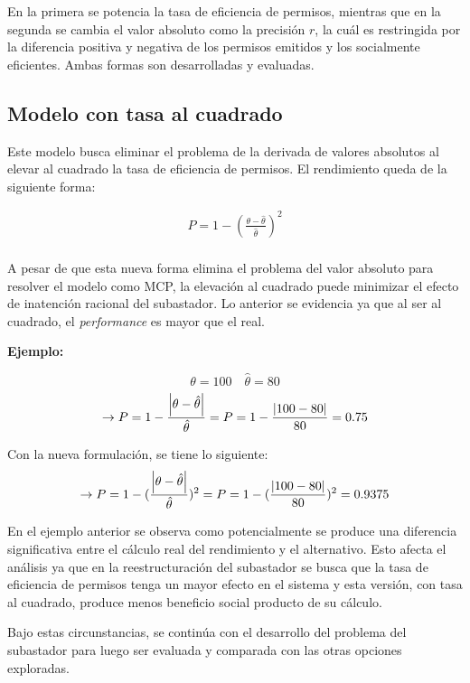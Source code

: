 En la primera se potencia la tasa de eficiencia de permisos, mientras que en la segunda se cambia el valor absoluto como la precisión $r$, la cuál es restringida por la diferencia positiva y negativa de los permisos emitidos y los socialmente eficientes. Ambas formas son desarrolladas y evaluadas.

\subsection{Modelo con tasa al cuadrado}\label{tasacuadrada}

Este modelo busca eliminar el problema de la derivada de valores absolutos al elevar al cuadrado la tasa de eficiencia de permisos. El rendimiento queda de la siguiente forma:  
\vspace{2.5mm}

\begin{equation}
\begin{array}{rrclcl}
\displaystyle P = 1- (\frac{{\theta - \hat{\theta}}}{\hat{\theta}})^2 \\
\end{array}
\end{equation}

A pesar de que esta nueva forma elimina el problema del valor absoluto para resolver el modelo como
MCP, la elevación al cuadrado puede minimizar el efecto de inatención racional del subastador. Lo anterior se evidencia ya que al ser al cuadrado, el \textit{performance} es mayor que el real. 
\vspace{2.5mm}

\textbf{Ejemplo:}

$$\theta= 100 \quad \hat{\theta}=80$$
$$\rightarrow P= 1 - \frac{\abs{\theta-\hat{\theta}}}{\hat{\theta}}=P= 1 - \frac{\abs{100-80}}{80} = 0.75$$

Con la nueva formulación, se tiene lo siguiente:
$$\rightarrow P= 1 - (\frac{\abs{\theta-\hat{\theta}}}{\hat{\theta}})^2=P= 1 - (\frac{\abs{100-80}}{80})^2 = 0.9375$$

En el ejemplo anterior se observa como potencialmente se produce una diferencia significativa entre el cálculo real del rendimiento y el alternativo. Esto afecta el análisis ya que en la reestructuración del subastador se busca que la tasa de eficiencia de permisos tenga un mayor efecto en el sistema y esta versión, con tasa al cuadrado, produce menos beneficio social producto de su cálculo.
\vspace{2.5mm}

Bajo estas circunstancias, se continúa con el desarrollo del problema del subastador para luego ser evaluada y comparada con las otras opciones exploradas. 
\vspace{2.5mm}

